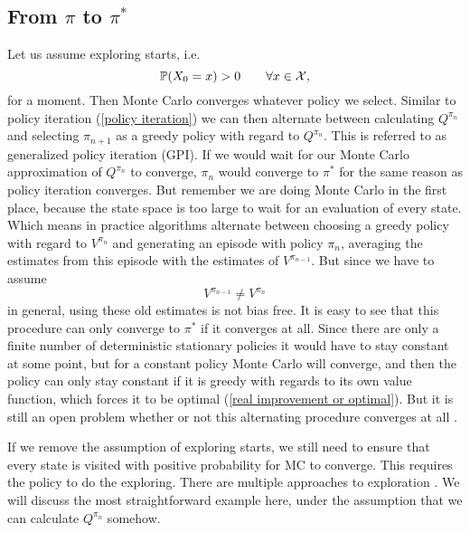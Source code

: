 \subsection{From \(\pi\) to \(\pi^*\)}
Let us assume exploring starts, i.e.
\[
	\mathbb{P}(X_0=x)>0 \qquad \forall x\in\mathcal{X},
\] 
for a moment. Then Monte Carlo converges whatever policy we select. Similar to policy iteration (\ref{policy iteration}) we can then alternate between calculating \(Q^{\pi_n}\) and selecting \(\pi_{n+1}\) as a greedy policy with regard to \(Q^{\pi_n}\). This is referred to as generalized policy iteration (GPI). If we would wait for our Monte Carlo approximation of \(Q^{\pi_n}\) to converge, \(\pi_n\) would converge to \(\pi^*\) for the same reason as policy iteration converges. But remember we are doing Monte Carlo in the first place, because the state space is too large to wait for an evaluation of every state. Which means in practice algorithms alternate between choosing a greedy policy with regard to \({V^{\pi_n}}\) and generating an episode with policy \(\pi_n\), averaging the estimates from this episode with the estimates of \(V^{\pi_{n-1}}\). But since we have to assume
\[
	V^{\pi_{n-1}}\neq V^{\pi_n}
\] 
in general, using these old estimates is not bias free. It is easy to see that this procedure can only converge to \(\pi^*\) if it converges at all. Since there are only a finite number of deterministic stationary policies it would have to stay constant at some point, but for a constant policy Monte Carlo will converge, and then the policy can only stay constant if it is greedy with regards to its own value function, which forces it to be optimal (\ref{real improvement or optimal}). But it is still an open problem whether or not this alternating procedure converges at all \parencite[99]{suttonReinforcementLearningIntroduction2018a}.

If we remove the assumption of exploring starts, we still need to ensure that every state is visited with positive probability for MC to converge. This requires the policy to do the exploring. There are multiple approaches to exploration . We will discuss the most straightforward example here, under the assumption that we can calculate \(Q^{\pi_n}\) somehow.  

